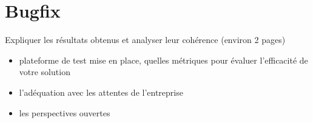 
\section{Bugfix}

Expliquer les résultats obtenus et analyser leur cohérence (environ 2 pages)
\begin{itemize}
	\item plateforme de test mise en place, quelles métriques pour évaluer l’efficacité de votre solution
	\item l'adéquation avec les attentes de l’entreprise
	\item les perspectives ouvertes

\end{itemize}

